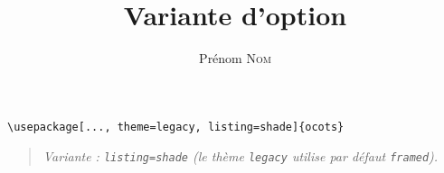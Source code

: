 \documentclass[11pt]{ocots-book}
\title{Variante d'option}
\author{Prénom \textsc{Nom}}
\newcommand{\ocotsvariantnote}[1]{\begin{quote}\itshape Variante : #1\end{quote}}
\begin{document}
\maketitle

\begin{lstlisting}
\usepackage[..., theme=legacy, listing=shade]{ocots}
\end{lstlisting}
\ocotsvariantnote{\texttt{listing=shade} (le th\`eme \texttt{legacy} utilise par d\'efaut \texttt{framed}).}

\end{document}
